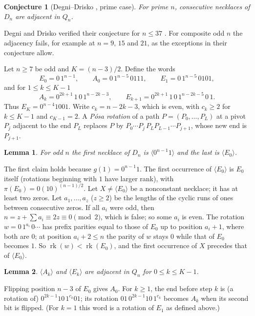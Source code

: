 \documentclass[journal,onecolumn,11pt]{IEEEtran}
\newtheorem{lemma}{Lemma}
\newtheorem{conjecture}{Conjecture}
\newcommand{\rk}{\operatorname{rk}}
\begin{document}
\begin{conjecture}[Degni--Drisko \cite{DD07}, prime case]\label{conj:DD}
For prime $n$, consecutive necklaces of $D_n$ are adjacent in $Q_n$.
\end{conjecture}

Degni and Drisko verified their conjecture for $n\le 37$ \cite[Section 3]{DD07}. For composite odd $n$ the adjacency
fails, for example at $n=9$, $15$ and $21$, as the exceptions in their conjecture allow.

Let $n\ge7$ be odd and $K=(n-3)/2$. Define the words
\[
E_0=0\,1^{n-1},\qquad A_0=0\,1^{n-5}\,0111,\qquad E_1=0\,1^{n-5}\,0101,
\]
and for $1\le k\le K-1$
\[
A_k=0^{2k+1}\,1\,0\,1^{n-2k-3},\qquad E_{k+1}=0^{2k+1}\,1\,0\,1^{n-2k-5}\,0\,1 .
\]
Thus $E_K=0^{n-4}1001$. Write $c_k=n-2k-3$, which is even, with $c_k\ge 2$ for $k\le K-1$ and $c_{K-1}=2$. A
\emph{P\'osa rotation} of a path $P=(P_0,\dots,P_L)$ at a pivot $P_j$ adjacent to the end $P_L$ replaces $P$ by
$P_0\cdots P_j\,P_L P_{L-1}\cdots P_{j+1}$, whose new end is $P_{j+1}$.

\begin{lemma}\label{lem:last}
For odd $n$ the first necklace of $D_n$ is $\langle0^{n-1}1\rangle$ and the last is $\langle E_0\rangle$.
\end{lemma}
\begin{IEEEproof}
The first claim holds because $g(1)=0^{n-1}1$. The first occurrence of $\langle E_0\rangle$ is $E_0$ itself
(rotations beginning with $1$ have larger rank), with $\pi(E_0)=0(10)^{(n-1)/2}$. Let $X\ne\langle E_0\rangle$ be a
nonconstant necklace; it has at least two zeros. Let $a_1,\dots,a_z$ ($z\ge2$) be the lengths of the cyclic runs of
ones between consecutive zeros. If all $a_i$ were odd, then $n=z+\sum a_i\equiv 2z\equiv0\pmod2$, which is false; so
some $a_i$ is even. The rotation $w=0\,1^{a_i}\,0\cdots$ has prefix parities equal to those of $E_0$ up to position
$a_i+1$, where both are $0$; at position $a_i+2\le n$ the parity of $w$ stays $0$ while that of $E_0$ becomes $1$.
So $\rk(w)<\rk(E_0)$, and the first occurrence of $X$ precedes that of $\langle E_0\rangle$.
\end{IEEEproof}

\begin{lemma}\label{lem:adj}
$\langle A_k\rangle$ and $\langle E_k\rangle$ are adjacent in $Q_n$ for $0\le k\le K-1$.
\end{lemma}
\begin{IEEEproof}
Flipping position $n-3$ of $E_0$ gives $A_0$. For $k\ge1$, the end before step $k$ is (a rotation of)
$0^{2k-1}10\,1^{c_k}01$; its rotation $01\,0^{2k-1}10\,1^{c_k}$ becomes $A_k$ when its second bit is flipped. (For
$k=1$ this word is a rotation of $E_1$ as defined above.)
\end{IEEEproof}
\end{document}
